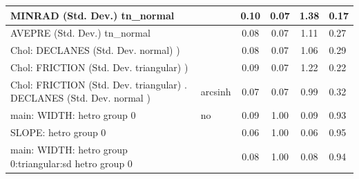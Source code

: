 \begin{table}
\begin{center}
\begin{tabular}{|l|l|c|c|c|l|}
			\hline
			MINRAD (Std. Dev.) tn_normal &  & 0.10 & 0.07 & 1.38 & 0.17 \\
			\hline
			AVEPRE (Std. Dev.) tn_normal &  & 0.08 & 0.07 & 1.11 & 0.27 \\
			\hline
			 Chol: DECLANES (Std. Dev. normal) ) &  & 0.08 & 0.07 & 1.06 & 0.29 \\
			\hline
			 Chol: FRICTION (Std. Dev. triangular) ) &  & 0.09 & 0.07 & 1.22 & 0.22 \\
			\hline
			 Chol: FRICTION (Std. Dev. triangular) . DECLANES (Std. Dev.   normal ) & arcsinh & 0.07 & 0.07 & 0.99 & 0.32 \\
			\hline
			main: WIDTH: hetro group 0 & no & 0.09 & 1.00 & 0.09 & 0.93 \\
			\hline
			SLOPE: hetro group 0 &  & 0.06 & 1.00 & 0.06 & 0.95 \\
			\hline
			main: WIDTH: hetro group 0:triangular:sd  hetro group 0 &  & 0.08 & 1.00 & 0.08 & 0.94 \\
			\hline
		\end{tabular}
	\end{center}
\end{table}